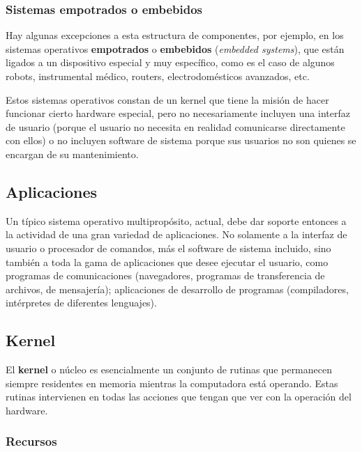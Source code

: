 \documentclass[spanish,A4,]{article}
\begin{document}
\subsubsection{Sistemas empotrados o
embebidos}\label{sistemas-empotrados-o-embebidos}

Hay algunas excepciones a esta estructura de componentes, por ejemplo,
en los sistemas operativos \textbf{empotrados} o \textbf{embebidos}
(\emph{embedded systems}), que están ligados a un dispositivo especial y
muy específico, como es el caso de algunos robots, instrumental médico,
routers, electrodomésticos avanzados, etc.

Estos sistemas operativos constan de un kernel que tiene la misión de
hacer funcionar cierto hardware especial, pero no necesariamente
incluyen una interfaz de usuario (porque el usuario no necesita en
realidad comunicarse directamente con ellos) o no incluyen software de
sistema porque sus usuarios no son quienes se encargan de su
mantenimiento.

\subsection{Aplicaciones}\label{aplicaciones}

Un típico sistema operativo multipropósito, actual, debe dar soporte
entonces a la actividad de una gran variedad de aplicaciones. No
solamente a la interfaz de usuario o procesador de comandos, más el
software de sistema incluido, sino también a toda la gama de
aplicaciones que desee ejecutar el usuario, como programas de
comunicaciones (navegadores, programas de transferencia de archivos, de
mensajería); aplicaciones de desarrollo de programas (compiladores,
intérpretes de diferentes lenguajes).

\subsection{Kernel}\label{kernel}

El \textbf{kernel} o núcleo es esencialmente un conjunto de rutinas que
permanecen siempre residentes en memoria mientras la computadora está
operando. Estas rutinas intervienen en todas las acciones que tengan que
ver con la operación del hardware.

\subsubsection{Recursos}\label{recursos}
\end{document}
